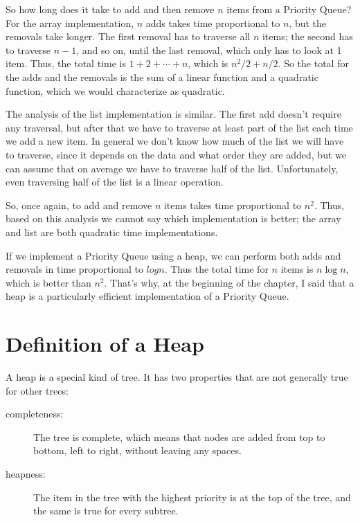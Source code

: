 \documentclass[12pt]{book}
\theoremstyle{exercise}
\begin{document}

So how long does it take to add and then remove $n$ items
from a Priority Queue?  For the array implementation, $n$
adds takes time proportional to $n$, but the removals
take longer.  The first removal has to traverse all $n$ items;
the second has to traverse $n-1$, and so on, until the last
removal, which only has to look at 1 item.  Thus, the total
time is $1 + 2 + \cdots + n$, which is $n^2/2 + n/2$.
So the total for the adds and the removals is the
sum of a linear function and a quadratic function, which
we would characterize as quadratic.

The analysis of the list implementation is similar.  The
first add doesn't require any traversal, but after that
we have to traverse at least part of the list each time we
add a new item.  In general we don't know how much of the
list we will have to traverse, since it depends on the data
and what order they are added, but we can assume that on
average we have to traverse half of the list.  Unfortunately,
even traversing half of the list is a linear operation.

So, once again, to add and remove $n$ items takes time
proportional to $n^2$.  Thus, based on this analysis we cannot
say which implementation is better; the array and
list are both quadratic time implementations.

If we implement a Priority Queue using a heap, we can
perform both adds and removals in time proportional
to $log n$.  Thus the total time for $n$ items is $n \log n$,
which is better than $n^2$.  That's why, at the beginning of
the chapter, I said that a heap is a particularly efficient
implementation of a Priority Queue.


\section{Definition of a Heap}

A heap is a special kind of tree.  It has two properties
that are not generally true for other trees:

\begin{description}

\item[completeness:] The tree is complete, which means that
nodes are added from top to bottom, left to right, without
leaving any spaces.

\item[heapness:] The item in the tree with the highest priority
is at the top of the tree, and the same is true for every subtree.

\end{description}
\end{document}
